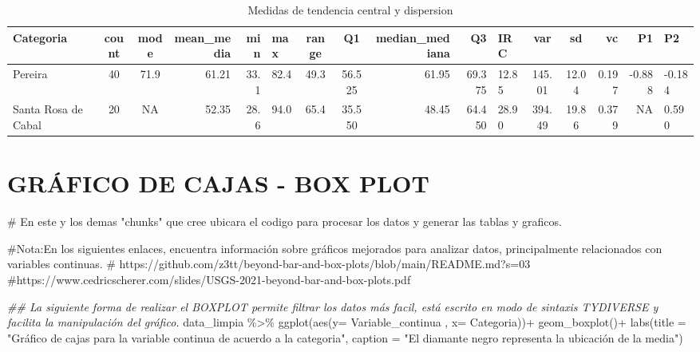 \documentclass[
  letterpaper,
  DIV=11,
  numbers=noendperiod]{scrreprt}
\newenvironment{Shaded}{\begin{snugshade}}{\end{snugshade}}
\newcommand{\AttributeTok}[1]{\textcolor[rgb]{0.40,0.45,0.13}{#1}}
\newcommand{\CommentTok}[1]{\textcolor[rgb]{0.37,0.37,0.37}{#1}}
\newcommand{\DocumentationTok}[1]{\textcolor[rgb]{0.37,0.37,0.37}{\textit{#1}}}
\newcommand{\FunctionTok}[1]{\textcolor[rgb]{0.28,0.35,0.67}{#1}}
\newcommand{\NormalTok}[1]{\textcolor[rgb]{0.00,0.23,0.31}{#1}}
\newcommand{\SpecialCharTok}[1]{\textcolor[rgb]{0.37,0.37,0.37}{#1}}
\newcommand{\StringTok}[1]{\textcolor[rgb]{0.13,0.47,0.30}{#1}}
\begin{document}
\begin{table}
\centering
\caption{Medidas de tendencia central y dispersion}
\centering
\begin{tabular}[t]{l|c|c|r|r|l|c|c|r|r|l|c|c|r|r|l}
\hline
Categoria & count & mode & mean\_media & min & max & range & Q1 & median\_mediana & Q3 & IRC & var & sd & vc & P1 & P2\\
\hline
Pereira & 40 & 71.9 & 61.21 & 33.1 & 82.4 & 49.3 & 56.525 & 61.95 & 69.375 & 12.85 & 145.01 & 12.04 & 0.197 & -0.888 & -0.184\\
\hline
Santa Rosa de Cabal & 20 & NA & 52.35 & 28.6 & 94.0 & 65.4 & 35.550 & 48.45 & 64.450 & 28.90 & 394.49 & 19.86 & 0.379 & NA & 0.590\\
\hline
\end{tabular}
\end{table}

\section{GRÁFICO DE CAJAS - BOX
PLOT}\label{gruxe1fico-de-cajas---box-plot}

\begin{Shaded}
\begin{Highlighting}[]
\CommentTok{\# En este y los demas "chunks" que cree ubicara el codigo para procesar los datos y generar las tablas y graficos.}

\CommentTok{\#Nota:En los siguientes enlaces, encuentra información sobre gráficos mejorados para analizar datos, principalmente relacionados con variables continuas.}
 \CommentTok{\# https://github.com/z3tt/beyond{-}bar{-}and{-}box{-}plots/blob/main/README.md?s=03}
\CommentTok{\#https://www.cedricscherer.com/slides/USGS{-}2021{-}beyond{-}bar{-}and{-}box{-}plots.pdf}

\DocumentationTok{\#\# La siguiente forma de realizar el BOXPLOT permite filtrar los datos más facil, está escrito en modo de sintaxis TYDIVERSE y facilita la manipulación del gráfico.}
\NormalTok{data\_limpia }\SpecialCharTok{\%\textgreater{}\%} 
  \FunctionTok{ggplot}\NormalTok{(}\FunctionTok{aes}\NormalTok{(}\AttributeTok{y=}\NormalTok{ Variable\_continua , }\AttributeTok{x=}\NormalTok{ Categoria))}\SpecialCharTok{+}
    \FunctionTok{geom\_boxplot}\NormalTok{()}\SpecialCharTok{+}
  \FunctionTok{labs}\NormalTok{(}\AttributeTok{title =} \StringTok{"Gráfico de cajas para la variable continua de acuerdo a la categoria"}\NormalTok{,}
       \AttributeTok{caption =} \StringTok{"El diamante negro representa la ubicación de la media"}\NormalTok{)}
\end{Highlighting}
\end{Shaded}
\end{document}
